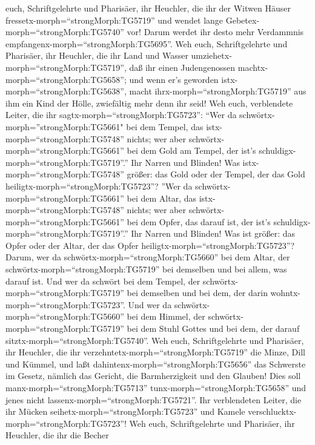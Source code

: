 euch, Schriftgelehrte und Pharisäer, ihr Heuchler, die ihr der Witwen
Häuser fressetx-morph=``strongMorph:TG5719'' und wendet lange
Gebetex-morph=``strongMorph:TG5740'' vor! Darum werdet ihr desto mehr
Verdammnis empfangenx-morph=``strongMorph:TG5695''.  Weh
euch, Schriftgelehrte und Pharisäer, ihr Heuchler, die ihr Land und
Wasser umziehetx-morph=``strongMorph:TG5719'', daß ihr einen
Judengenossen machtx-morph=``strongMorph:TG5658''; und wenn er's
geworden istx-morph=``strongMorph:TG5638'', macht
ihrx-morph=``strongMorph:TG5719'' aus ihm ein Kind der Hölle, zwiefältig
mehr denn ihr seid!  Weh euch, verblendete Leiter, die ihr
sagtx-morph=``strongMorph:TG5723'': ``Wer da
schwörtx-morph=''strongMorph:TG5661" bei dem Tempel, das
istx-morph=``strongMorph:TG5748'' nichts; wer aber
schwörtx-morph=``strongMorph:TG5661'' bei dem Gold am Tempel, der ist's
schuldigx-morph=``strongMorph:TG5719''.''  Ihr Narren und
Blinden! Was istx-morph=``strongMorph:TG5748'' größer: das Gold oder der
Tempel, der das Gold heiligtx-morph=``strongMorph:TG5723''?
 ''Wer da schwörtx-morph=``strongMorph:TG5661'' bei dem
Altar, das istx-morph=``strongMorph:TG5748'' nichts; wer aber
schwörtx-morph=``strongMorph:TG5661'' bei dem Opfer, das darauf ist, der
ist's schuldigx-morph=``strongMorph:TG5719''.''  Ihr Narren
und Blinden! Was ist größer: das Opfer oder der Altar, der das Opfer
heiligtx-morph=``strongMorph:TG5723''?  Darum, wer da
schwörtx-morph=``strongMorph:TG5660'' bei dem Altar, der
schwörtx-morph=``strongMorph:TG5719'' bei demselben und bei allem, was
darauf ist.  Und wer da schwört bei dem Tempel, der
schwörtx-morph=``strongMorph:TG5719'' bei demselben und bei dem, der
darin wohntx-morph=``strongMorph:TG5723''.  Und wer da
schwörtx-morph=``strongMorph:TG5660'' bei dem Himmel, der
schwörtx-morph=``strongMorph:TG5719'' bei dem Stuhl Gottes und bei dem,
der darauf sitztx-morph=``strongMorph:TG5740''.  Weh euch,
Schriftgelehrte und Pharisäer, ihr Heuchler, die ihr
verzehntetx-morph=``strongMorph:TG5719'' die Minze, Dill und Kümmel, und
laßt dahintenx-morph=``strongMorph:TG5656'' das Schwerste im Gesetz,
nämlich das Gericht, die Barmherzigkeit und den Glauben! Dies soll
manx-morph=``strongMorph:TG5713'' tunx-morph=``strongMorph:TG5658'' und
jenes nicht lassenx-morph=``strongMorph:TG5721''.  Ihr
verblendeten Leiter, die ihr Mücken seihetx-morph=``strongMorph:TG5723''
und Kamele verschlucktx-morph=``strongMorph:TG5723''!  Weh
euch, Schriftgelehrte und Pharisäer, ihr Heuchler, die ihr die Becher
